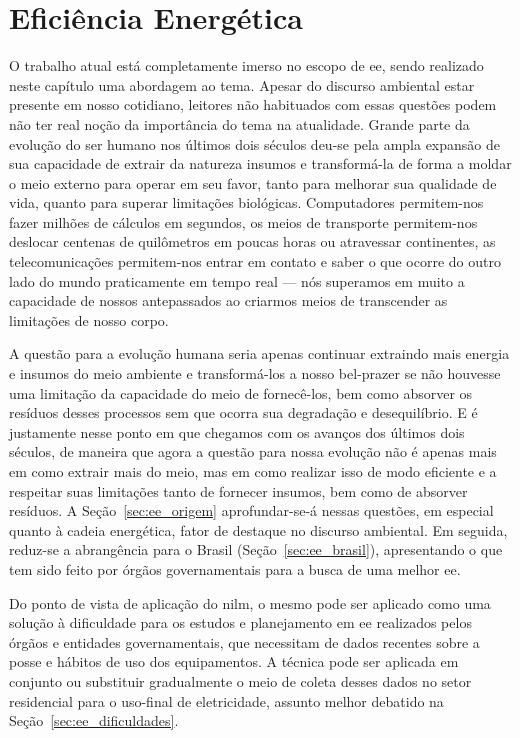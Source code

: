 \chapter{Eficiência Energética}
\label{chap:ee}
\glsresetall

O trabalho atual está completamente imerso no escopo de \gls{ee},
sendo realizado neste capítulo uma abordagem ao tema. Apesar do
discurso ambiental estar presente em nosso cotidiano, leitores não
habituados com essas questões podem não ter real noção da importância
do tema na atualidade. Grande parte da evolução do ser humano nos
últimos dois séculos deu-se pela ampla expansão de sua capacidade de
extrair da natureza insumos e transformá-la de forma a moldar o meio
externo para operar em seu favor, tanto para melhorar sua qualidade de
vida, quanto para superar limitações biológicas. Computadores
permitem-nos fazer milhões de cálculos em segundos, os meios de
transporte permitem-nos deslocar centenas de quilômetros em poucas
horas ou atravessar continentes, as telecomunicações permitem-nos
entrar em contato e saber o que ocorre do outro lado do mundo
praticamente em tempo real --- nós superamos em muito a capacidade de
nossos antepassados ao criarmos meios de transcender as limitações de
nosso corpo. 

A questão para a evolução humana seria apenas continuar
extraindo mais energia e insumos do meio ambiente e transformá-los a
nosso bel-prazer se não houvesse uma limitação da capacidade do meio
de fornecê-los, bem como absorver os resíduos desses processos sem que
ocorra sua degradação e desequilíbrio. E é justamente nesse ponto em
que chegamos com os avanços dos últimos dois séculos, de maneira que
agora a questão para nossa evolução não é apenas mais em como extrair
mais do meio, mas em como realizar isso de modo eficiente e a
respeitar suas limitações tanto de fornecer insumos, bem como de absorver
resíduos. A Seção~\ref{sec:ee_origem} aprofundar-se-á nessas
questões, em especial quanto à cadeia energética, fator de destaque no
discurso ambiental. Em seguida, reduz-se a abrangência para o Brasil
(Seção~\ref{sec:ee_brasil}), apresentando o que tem sido feito por
órgãos governamentais para a busca de uma melhor \gls{ee}. 

Do ponto de vista de aplicação do \acs{nilm}, o mesmo pode ser
aplicado como uma solução à dificuldade para os estudos e planejamento
em \gls{ee} realizados pelos órgãos e entidades governamentais, que
necessitam de dados recentes sobre a posse e hábitos de uso dos
equipamentos. A técnica pode ser aplicada em conjunto ou substituir
gradualmente o meio de coleta desses dados no setor residencial para o
uso-final de eletricidade, assunto melhor debatido na
Seção~\ref{sec:ee_dificuldades}.

